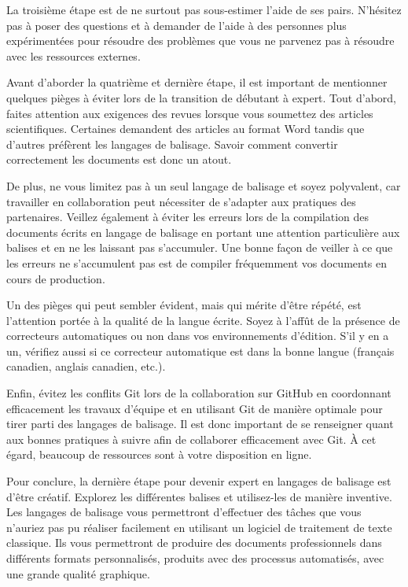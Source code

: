\documentclass[
  letterpaper,
  DIV=11,
  numbers=noendperiod]{scrreprt}
\begin{document}
La troisième étape est de ne surtout pas sous-estimer l'aide de ses
pairs. N'hésitez pas à poser des questions et à demander de l'aide à des
personnes plus expérimentées pour résoudre des problèmes que vous ne
parvenez pas à résoudre avec les ressources externes.

Avant d'aborder la quatrième et dernière étape, il est important de
mentionner quelques pièges à éviter lors de la transition de débutant à
expert. Tout d'abord, faites attention aux exigences des revues lorsque
vous soumettez des articles scientifiques. Certaines demandent des
articles au format Word tandis que d'autres préfèrent les langages de
balisage. Savoir comment convertir correctement les documents est donc
un atout.

De plus, ne vous limitez pas à un seul langage de balisage et soyez
polyvalent, car travailler en collaboration peut nécessiter de s'adapter
aux pratiques des partenaires. Veillez également à éviter les erreurs
lors de la compilation des documents écrits en langage de balisage en
portant une attention particulière aux balises et en ne les laissant pas
s'accumuler. Une bonne façon de veiller à ce que les erreurs ne
s'accumulent pas est de compiler fréquemment vos documents en cours de
production.

Un des pièges qui peut sembler évident, mais qui mérite d'être répété,
est l'attention portée à la qualité de la langue écrite. Soyez à l'affût
de la présence de correcteurs automatiques ou non dans vos
environnements d'édition. S'il y en a un, vérifiez aussi si ce
correcteur automatique est dans la bonne langue (français canadien,
anglais canadien, etc.).

Enfin, évitez les conflits Git lors de la collaboration sur GitHub en
coordonnant efficacement les travaux d'équipe et en utilisant Git de
manière optimale pour tirer parti des langages de balisage. Il est donc
important de se renseigner quant aux bonnes pratiques à suivre afin de
collaborer efficacement avec Git. À cet égard, beaucoup de ressources
sont à votre disposition en ligne.

Pour conclure, la dernière étape pour devenir expert en langages de
balisage est d'être créatif. Explorez les différentes balises et
utilisez-les de manière inventive. Les langages de balisage vous
permettront d'effectuer des tâches que vous n'auriez pas pu réaliser
facilement en utilisant un logiciel de traitement de texte classique.
Ils vous permettront de produire des documents professionnels dans
différents formats personnalisés, produits avec des processus
automatisés, avec une grande qualité graphique.
\end{document}
